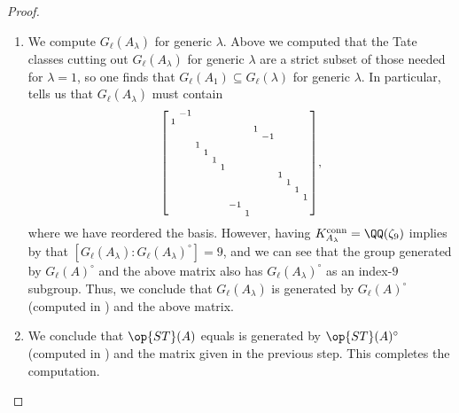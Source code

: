 \documentclass[../thesis.tex]{subfiles}
\begin{document}
\begin{proof}
\begin{enumerate}
		\item We compute $G_\ell(A_\lambda)$ for generic $\lambda$. Above we computed that the Tate classes cutting out $G_\ell(A_\lambda)$ for generic $\lambda$ are a strict subset of those needed for $\lambda=1$, so one finds that $G_\ell(A_1)\subseteq G_\ell(\lambda)$ for generic $\lambda$. In particular,  tells us that $G_\ell(A_\lambda)$ must contain
		\[\begin{bsmallmatrix}
			& -1 \\
			1 \\
			&& &&&&&& 1 \\
			&& &&&&&& & -1 \\
			&& 1 \\
			&& & 1 \\
			&& && 1 \\
			&& && & 1 \\
			&& &&&&&&&& 1 \\
			&& &&&&&&&& & 1 \\
			&& &&&&&&&&&& 1 \\
			&& &&&&&&&&&& & 1 \\
			&& &&&& -1 \\
			&& &&&& & 1
		\end{bsmallmatrix},\]
		where we have reordered the basis. However, having $K_{A_\lambda}^{\mathrm{conn}}=\QQ(\zeta_9)$ implies by  that $[G_\ell(A_\lambda):G_\ell(A_\lambda)^\circ]=9$, and we can see that the group generated by $G_\ell(A)^\circ$ and the above matrix also has $G_\ell(A_\lambda)^\circ$ as an index-$9$ subgroup. Thus, we conclude that $G_\ell(A_\lambda)$ is generated by $G_\ell(A)^\circ$ (computed in ) and the above matrix.

		\item We conclude that $\op{ST}(A)$ equals is generated by $\op{ST}(A)^\circ$ (computed in ) and the matrix given in the previous step. This completes the computation.
		\qedhere
	\end{enumerate}
\end{proof}




\end{document}
